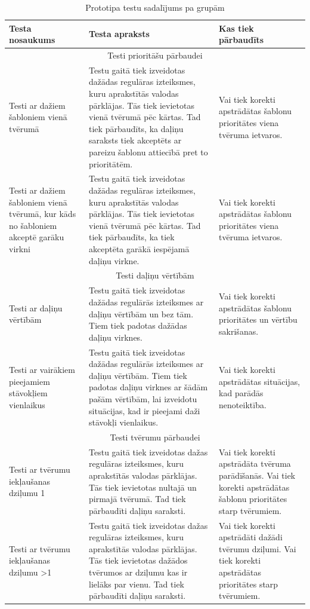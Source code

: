 \begin{longtable}{|p{90pt}|p{210pt}|p{120pt}|}
\caption{\label{fig:tests}Prototipa testu sadalījums pa grupām} \\ \hline
\textbf{Testa nosaukums} & \textbf{Testa apraksts} & \textbf{Kas tiek pārbaudīts} \\ \hline
\endhead
\multicolumn{ 3}{|c|}{Testi prioritāšu pārbaudei} \\ \hline
Testi ar dažiem šabloniem vienā tvērumā & Testu gaitā tiek izveidotas dažādas regulāras izteiksmes, kuru aprakstītās valodas pārklājas. Tās tiek ievietotas vienā tvērumā pēc kārtas. Tad tiek pārbaudīts, ka daļiņu saraksts tiek akceptēts ar pareizu šablonu attiecībā pret to prioritātēm. & Vai tiek korekti apstrādātas šablonu prioritātes viena tvēruma ietvaros. \\ \hline
Testi ar dažiem šabloniem vienā tvērumā, kur kāds no šabloniem akceptē garāku virkni & Testu gaitā tiek izveidotas dažādas regulāras izteiksmes, kuru aprakstītās valodas pārklājas. Tās tiek ievietotas vienā tvērumā pēc kārtas. Tad tiek pārbaudīts, ka tiek akceptēta garākā iespējamā daļiņu virkne. & Vai tiek korekti apstrādātas šablonu prioritātes viena tvēruma ietvaros. \\ \hline
\multicolumn{ 3}{|c|}{Testi daļiņu vērtībām} \\ \hline
Testi ar daļiņu vērtībām & Testu gaitā tiek izveidotas dažādas regulārās izteiksmes ar daļiņu vērtībām un bez tām. Tiem tiek padotas dažādas daļiņu virknes. & Vai tiek korekti apstrādātas šablonu prioritātes un vērtību sakrišanas. \\ \hline
Testi ar vairākiem pieejamiem stāvokļiem vienlaikus & Testu gaitā tiek izveidotas dažādas regulārās izteiksmes ar daļiņu vērtībām. Tiem tiek padotas daļiņu virknes ar šādām pašām vērtībām, lai izveidotu situācijas, kad ir pieejami daži stāvokļi vienlaikus. & Vai tiek korekti apstrādātas situācijas, kad parādās nenoteiktība. \\ \hline
\multicolumn{ 3}{|c|}{Testi tvērumu pārbaudei} \\ \hline
Testi ar tvērumu iekļaušanas dziļumu 1 & Testu gaitā tiek izveidotas dažas regulāras izteiksmes, kuru aprakstītās valodas pārklājas. Tās tiek ievietotas nultajā un pirmajā tvērumā. Tad tiek pārbaudīti daļiņu saraksti. & Vai tiek korekti apstrādāta tvēruma parādīšanās. Vai tiek korekti apstrādātas šablonu prioritātes starp tvērumiem. \\ \hline
Testi ar tvērumu iekļaušanas dziļumu >1 & Testu gaitā tiek izveidotas dažas regulāras izteiksmes, kuru aprakstītās valodas pārklājas. Tās tiek ievietotas dažādos tvērumos ar dziļumu kas ir lielāks par vienu. Tad tiek pārbaudīti daļiņu saraksti. & Vai tiek korekti apstrādāti dažādi tvērumu dziļumi. Vai tiek korekti apstrādātas prioritātes starp tvērumiem. \\ \hline

\end{longtable}
